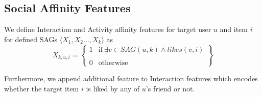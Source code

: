\subsection{Social Affinity Features}
\label{ssec:SAfeature}
We define Interaction and Activity affinity features for target user $u$ and item $i$ for defined SAGs $ \langle X_{1},X_{2}\ldots,X_{k}\rangle$ as
  \begin{equation*}
   X_{k,u,i} = \begin{Bmatrix}
   		\mathit{1} & \text{if}\ \exists v\in SAG(u,k) \wedge likes(v,i)\\ \\
   		\mathit{0} & \text{otherwise}
   \end{Bmatrix}
  \end{equation*}

Furthermore, we append additional feature to Interaction features which encodes whether the target item $i$ is liked by any of $u$'s friend or not.



